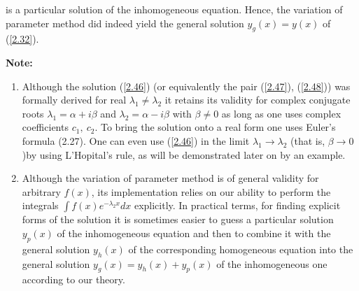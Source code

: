 \documentclass[11pt,a4paper]{article}
\begin{document}
	is a particular solution of the inhomogeneous equation. Hence, the variation of parameter method did indeed yield the general solution $y_g(x) = y(x)$ of (\ref{2.32}).\par
	\textbf{Note:}
	\begin{enumerate}
		\item Although the solution (\ref{2.46}) (or equivalently the pair (\ref{2.47}), (\ref{2.48})) was formally derived for real $\lambda_1 \neq \lambda_2$ it retains its validity for complex conjugate roots $\lambda_1 = \alpha + i\beta$ and $\lambda_2 = \alpha−i\beta$ with $\beta \neq 0$ as long as one uses complex coefficients $c_1,\ c_2$. To bring the solution onto a real form one uses Euler’s formula (2.27). One can even use (\ref{2.46}) in the limit $\lambda_1 \to \lambda_2$ (that is, $\beta \to 0$)by using L’Hopital’s rule, as will be demonstrated later on by an example.
		\item Although the variation of parameter method is of general validity for arbitrary $f(x)$, its implementation relies on our ability to perform the integrals $\int f(x)e^{-\lambda_2x}dx$ explicitly. In practical terms, for finding explicit forms of the solution it is sometimes easier to guess a particular solution $y_p(x)$ of the inhomogeneous equation and then to combine it with the general solution $y_h(x)$ of the corresponding homogeneous equation into the general solution $y_g(x) = y_h(x) + y_p(x)$ of the inhomogeneous one according to our theory.
	\end{enumerate}
\end{document}
